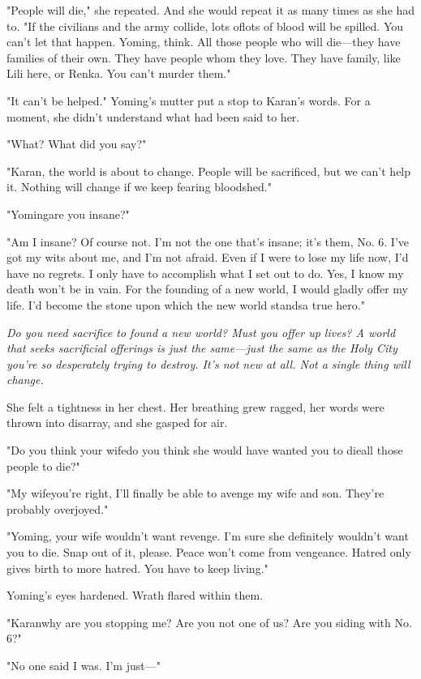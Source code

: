 "People will die," she repeated. And she would repeat it as many times
as she had to. "If the civilians and the army collide, lots of\el lots
of blood will be spilled. You can't let that happen. Yoming, think. All
those people who will die---they have families of their own. They have
people whom they love. They have family, like Lili here, or Renka. You
can't murder them."

"It can't be helped." Yoming's mutter put a stop to Karan's words. For a
moment, she didn't understand what had been said to her.

"What? What did you say?"

"Karan, the world is about to change. People will be sacrificed, but we
can't help it. Nothing will change if we keep fearing bloodshed."

"Yoming\el are you insane?"

"Am I insane? Of course not. I'm not the one that's insane; it's them,
No. 6. I've got my wits about me, and I'm not afraid. Even if I were to
lose my life now, I'd have no regrets. I only have to accomplish what I
set out to do. Yes, I know my death won't be in vain. For the founding
of a new world, I would gladly offer my life. I'd become the stone upon
which the new world stands\el a true hero."

\emph{Do you need sacrifice to found a new world? Must you offer up lives? A
world that seeks sacrificial offerings is just the same---just the same as
the Holy City you're so desperately trying to destroy. It's not new at
all. Not a single thing will change.}

She felt a tightness in her chest. Her breathing grew ragged, her words
were thrown into disarray, and she gasped for air.

"Do you think your wife\el do you think she would have wanted you to
die\el all those people to die?"

"My wife\el you're right, I'll finally be able to avenge my wife and
son. They're probably overjoyed."

"Yoming, your wife wouldn't want revenge. I'm sure she definitely
wouldn't want you to die. Snap out of it, please. Peace won't come from
vengeance. Hatred only gives birth to more hatred. You have to keep
living."

Yoming's eyes hardened. Wrath flared within them.

"Karan\el why are you stopping me? Are you not one of us? Are you siding
with No. 6?"

"No one said I was. I'm just---"

